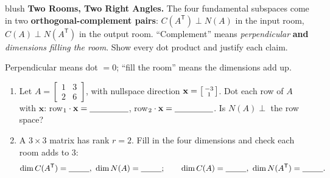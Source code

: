 \documentclass[10pt]{article}
\newcommand{\xx}{\mathbf{x}}
\newcommand{\T}{\mathsf{T}}
\begin{document}
\namepartnerperiod

\vspace{0.10in}

\begin{headlinebox}{blush}
\small\textbf{Two Rooms, Two Right Angles.} The four fundamental subspaces come in two
\textbf{orthogonal-complement pairs}: $C(A^{\T})\perp N(A)$ in the input room, $C(A)\perp N(A^{\T})$ in
the output room. ``Complement'' means \emph{perpendicular} \textbf{and} \emph{dimensions filling the
room}. Show every dot product and justify each claim.
\end{headlinebox}

\vspace{0.08in}

\begin{tcolorbox}[colback=white, colframe=black!40, title=\textbf{Tier R --- Remediate},
    fonttitle=\bfseries, arc=1.5mm, left=3mm, right=3mm, top=2mm, bottom=2mm, breakable]
Perpendicular means dot $=0$; ``fill the room'' means the dimensions add up.
\begin{enumerate}[leftmargin=1.7em, itemsep=8pt]
  \item Let $A=\begin{bmatrix} 1 & 3 \\ 2 & 6 \end{bmatrix}$, with nullspace direction
        $\xx=\begin{bsmallmatrix} -3\\1 \end{bsmallmatrix}$. Dot each row of $A$ with $\xx$:
        \; row$_1\cdot\xx=\blank{1.6cm}$, \; row$_2\cdot\xx=\blank{1.6cm}$. Is $N(A)\perp$ the row space?
        \blank{2.0cm}
  \item A $3\times 3$ matrix has rank $r=2$. Fill in the four dimensions and check each room adds to $3$:
        \[
          \dim C(A^{\T})=\blank{0.9cm},\ \dim N(A)=\blank{0.9cm};\qquad
          \dim C(A)=\blank{0.9cm},\ \dim N(A^{\T})=\blank{0.9cm}.
        \]
\end{enumerate}
\end{tcolorbox}
\end{document}
